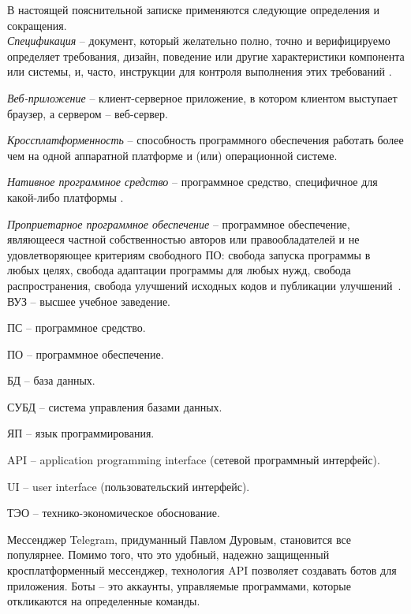 \label{sec:definitions}

В настоящей пояснительной записке применяются следующие определения и сокращения.
\\

\emph{Спецификация} -- документ, который желательно полно, точно и верифицируемо определяет требования, дизайн, поведение или другие характеристики компонента или системы, и, часто, инструкции для контроля выполнения этих требований \cite{istqb_specification}.

\emph{Веб-приложение} -- клиент-серверное приложение, в котором клиентом выступает браузер, а сервером -- веб-сервер.

\emph{Кроссплатформенность} -- способность программного обеспечения работать более чем на одной аппаратной платформе и (или) операционной системе.

\emph{Нативное программное средство} -- программное средство, специфичное для какой-либо платформы \cite{habr_crossplatform}.

\emph{Проприетарное программное обеспечение} -- программное обеспечение, являющееся частной собственностью авторов или правообладателей и не удовлетворяющее критериям свободного ПО: свобода запуска программы в любых целях, свобода адаптации программы для любых нужд, свобода распространения, свобода улучшений исходных кодов и публикации улучшений~\cite{free_software}.
\\

ВУЗ -- высшее учебное заведение.

ПС -- программное средство.

ПО -- программное обеспечение.

БД -- база данных.

СУБД -- система управления базами данных.

ЯП -- язык программирования.

API -- application programming interface (сетевой программный интерфейс).

UI -- user interface (пользовательский интерфейс).

ТЭО -- технико-экономическое обоснование.


\label{sec:introduction}


Мессенджер Telegram, придуманный Павлом Дуровым, становится все популярнее. Помимо того, что это удобный, надежно защищенный кросплатформенный мессенджер, технология API позволяет создавать ботов для приложения. Боты – это аккаунты, управляемые программами, которые откликаются на определенные команды.

